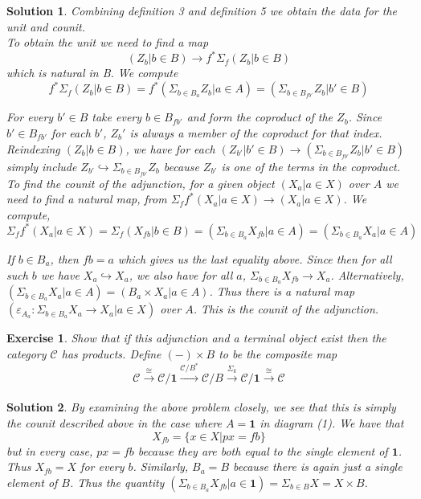 \documentclass{article}
\theoremstyle{problemstyle}
\theoremstyle{problemstyle}
\theoremstyle{problemstyle}
\theoremstyle{problemstyle}
\theoremstyle{problemstyle}
\theoremstyle{problemstyle}
\newtheorem{solution}{Solution}
\theoremstyle{problemstyle}
\theoremstyle{problemstyle}
\newtheorem{exercise}{Exercise}
\begin{document}
\begin{solution}
Combining definition 3 and definition 5 we obtain the data for the unit and counit.\\ 

To obtain the unit we need to find a map $$(Z_b|b \in B) \rightarrow f^*\Sigma_f(Z_b|b \in B)$$ which is natural in B. We compute $$f^*\Sigma_f(Z_b|b\in B) = f^*(\Sigma_{b\in B_a}Z_b|a\in A) = (\Sigma_{b\in B_{fb'}}Z_b|b'\in B)$$

For every $b' \in B$ take every $b \in B_{fb'}$ and form the coproduct of the $Z_b$. Since $b' \in B_{fb'}$ for each $b'$, $Z_b'$ is always a member of the coproduct for that index. Reindexing $(Z_b|b \in B)$, we have for each $(Z_{b'}|b' \in B) \rightarrow (\Sigma_{b\in B_{fb'}}Z_b|b'\in B)$ simply include $Z_{b'} \hookrightarrow \Sigma_{b\in B_{fb'}}Z_b$ because $Z_{b'}$ is one of the terms in the coproduct.\\  

To find the counit of the adjunction, for a given object $(X_a|a\in X)$ over $A$ we need to find a natural map, from $\Sigma_ff^*(X_a|a\in X) \rightarrow (X_a|a\in X)$. We compute, $$\Sigma_ff^*(X_a|a\in X) = \Sigma_f(X_{fb}|b\in B) = (\Sigma_{b\in B_a}X_{fb}|a\in A) =  (\Sigma_{b\in B_a}X_a|a\in A)$$

If $b \in B_a$, then $fb = a$ which gives us the last equality above. Since then for all such $b$ we have $X_{a} \hookrightarrow X_a$, we also have for all $a$, $\Sigma_{b\in B_a}X_{fb} \rightarrow X_a$. Alternatively, $(\Sigma_{b\in B_a}X_a|a\in A) = (B_a\times X_a|a \in A)$. Thus there is a natural map $(\varepsilon_{A_a}:\Sigma_{b\in B_a}X_{a} \rightarrow X_a|a\in X)$ over $A$. This is the counit of the adjunction.\\


\end{solution}

\begin{exercise}
Show that if this adjunction and a terminal object exist then the category $\mathcal{C}$ has products. Define $(-)\times B$ to be the composite map $$\mathcal{C}\xrightarrow[]{\cong} \mathcal{C}/\textbf{1} \xrightarrow[]{\mathcal{C}/B^*} \mathcal{C}/B \xrightarrow[]{\Sigma_k} \mathcal{C}/\textbf{1} \xrightarrow[]{\cong} \mathcal{C}$$
\end{exercise}

\begin{solution}
By examining the above problem closely, we see that this is simply the counit described above in the case where $A = \textbf{1}$ in diagram (1). We have that $$X_{fb} = \{x \in X | px = fb\}$$ but in every case, $px = fb$ because they are both equal to the single element of $\textbf{1}$. Thus $X_{fb} = X$ for every $b$. Similarly, $B_a = B$ because there is again just a single element of $B$. Thus the quantity $(\Sigma_{b\in B_a}X_{fb}|a \in \textbf{1}) = \Sigma_{b \in B}X = X \times B$. 
\end{solution}
\end{document}
